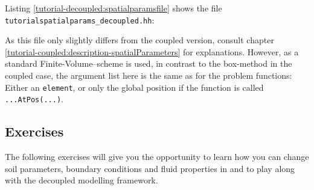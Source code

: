 Listing \ref{tutorial-decoupled:spatialparamsfile} shows the file
\verb+tutorialspatialparams_decoupled.hh+:

\begin{lst}\label{tutorial-decoupled:spatialparamsfile} \mbox{}

\end{lst}
As this file only slightly differs from the coupled version, consult 
chapter \ref{tutorial-coupled:description-spatialParameters} for explanations.
However, as a standard Finite-Volume--scheme is used, in contrast to the box-method
in the coupled case, the argument list here is the same as for the problem 
functions: Either an \texttt{element}, or only the global position if the function is called \texttt{...AtPos(...)}.

\subsection{Exercises}
\label{tutorial-deoucpled:exercises}
The following exercises will give you the opportunity to learn how you can change 
soil parameters, boundary conditions and fluid properties in \Dumux and to play along 
with the decoupled modelling framework.

